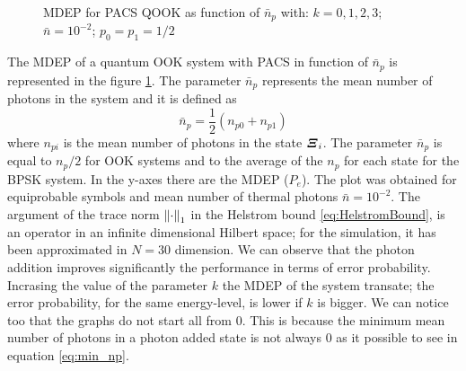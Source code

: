     \begin{figure}[t]
        \begin{center}
            
            \caption{MDEP for PACS QOOK as function of $\bar{n}_p$ with: $k=0,1,2,3$; $\bar{n}=10^{-2}$; $p_0=p_1=1/2$}
            \label{fig:3.1}
        \end{center}
    \end{figure}
    The MDEP of a quantum OOK system with PACS in function of $\bar{n}_p$ is represented in the figure
    \ref{fig:3.1}. The parameter $\bar{n}_p$ represents the mean number of photons in the system and it is 
    defined as
    \begin{equation*}
        \bar{n}_p=\frac{1}{2} \left(n_{p0}+n_{p1}\right)
    \end{equation*}
    where $n_{pi}$ is the mean number of photons in the state $\Operator{\varXi}_i$.
    The parameter $\bar{n}_p$ is equal to $n_p/2$ for OOK systems and to the average of the $n_p$ for 
    each state for the BPSK system.
    In the y-axes there are the MDEP ($P_e$). The plot was obtained for equiprobable symbols and 
    mean number of thermal photons $\bar{n}=10^{-2}$.  
    The argument of the trace norm $\norm{\cdot}_1$ in the Helstrom bound 
    \ref{eq:HelstromBound}, is an operator in an infinite dimensional Hilbert space; for the 
    simulation, it has been approximated in $N=30$ dimension.
    We can observe that the photon addition improves significantly the performance in terms
    of error probability. Incrasing the value of the parameter $k$ the MDEP of the system 
    transate; the error probability, for the same energy-level, is lower if $k$ is bigger.
    We can notice too that the graphs do not start all from $0$. This is because the minimum
    mean number of photons in a photon added state is not always $0$ as it possible to see in 
    equation \ref{eq:min_np}.  


